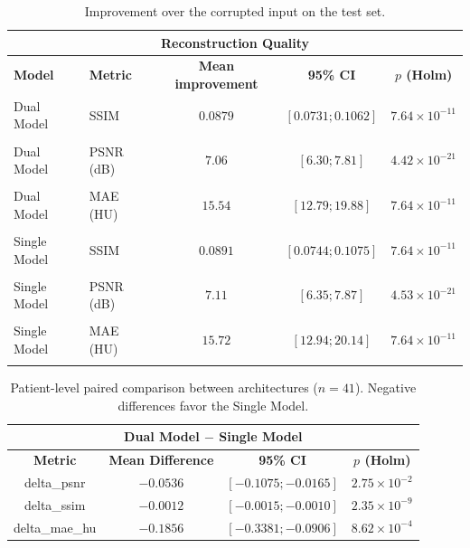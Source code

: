 \begin{table}[htbp]
\centering
\small
\begin{tabular}{llccc}
\multicolumn{5}{c}{\textbf{Reconstruction Quality}} \\[3pt]
\toprule
\textbf{Model} & \textbf{Metric} & \textbf{Mean improvement} & \textbf{95\% CI} & \textbf{$p$ (Holm)} \\
\midrule
Dual Model & SSIM & $0.0879$ & $[0.0731; 0.1062]$ & $7.64\times10^{-11}$ \\\\
Dual Model & PSNR (dB) & $7.06$ & $[6.30; 7.81]$ & $4.42\times10^{-21}$ \\\\
Dual Model & MAE (HU) & $15.54$ & $[12.79; 19.88]$ & $7.64\times10^{-11}$ \\\\
Single Model & SSIM & $0.0891$ & $[0.0744; 0.1075]$ & $7.64\times10^{-11}$ \\\\
Single Model & PSNR (dB) & $7.11$ & $[6.35; 7.87]$ & $4.53\times10^{-21}$ \\\\
Single Model & MAE (HU) & $15.72$ & $[12.94; 20.14]$ & $7.64\times10^{-11}$ \\\\
\bottomrule
\end{tabular}
\captionsetup{skip=2pt}
\caption[Improvement over corrupted input]{Improvement over the corrupted input on the test set.}
\label{tab:ablation_improvement}
\end{table}

\begin{table}[htbp]
\centering
\small
\begin{tabular}{cccc}
\multicolumn{4}{c}{\textbf{Dual Model $-$ Single Model}} \\[3pt]
\hline
\textbf{Metric} & \textbf{Mean Difference} & \textbf{95\% CI} & \textbf{$p$ (Holm)} \\
\hline
delta\_psnr & $-0.0536$ & $[-0.1075; -0.0165]$ & $2.75\times10^{-2}$ \\
delta\_ssim & $-0.0012$ & $[-0.0015; -0.0010]$ & $2.35\times10^{-9}$ \\
delta\_mae\_hu & $-0.1856$ & $[-0.3381; -0.0906]$ & $8.62\times10^{-4}$ \\
\hline
\end{tabular}
\captionsetup{skip=2pt}
\caption[Paired Single vs Dual Model comparison]{Patient-level paired comparison between architectures ($n=41$). Negative differences favor the Single Model.}
\label{tab:workflow-paired-comparison}
\end{table}
